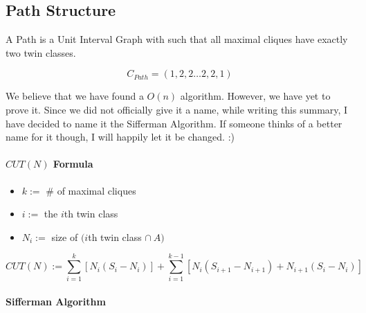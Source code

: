 \documentclass[12pt]{article}
\begin{document}
\pagebreak


\subsection{Path Structure}
A Path is a Unit Interval Graph with such that all maximal cliques have exactly two twin classes.

$$C_{Path} = (1, 2, 2 \ldots 2, 2, 1)$$

We believe that we have found a $O(n)$ algorithm. However, we have yet to prove it. Since we did not officially give it a name, while writing this summary, I have decided to name it the Sifferman Algorithm. If someone thinks of a better name for it though, I will happily let it be changed. :)

\paragraph{$CUT(N)$ Formula} \leavevmode
    
\begin{itemize}
    \item $k :=$ \# of maximal cliques
    \item $i :=$ the $i$th twin class
    \item $N_i :=$ size of $(i$th twin class $\cap~A)$
\end{itemize}
$$CUT(N) := \sum_{i=1}^{k} \left[ N_i(S_i - N_i) \right] + \sum_{i=1}^{k-1} \left[ N_i(S_{i+1} - N_{i+1}) + N_{i+1}(S_i - N_i) \right] \nonumber$$


\pagebreak


\paragraph{Sifferman Algorithm} \leavevmode

\end{document}
